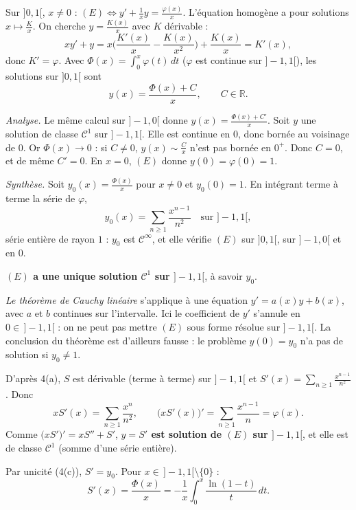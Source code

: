 \documentclass[a4paper,11pt]{article}
\numberwithin{equation}{section}
\numberwithin{figure}{section}
\numberwithin{table}{section}
\theoremstyle{enonce}
\theoremstyle{exemple}
\theoremstyle{remarque}
\newcommand{\R}{\mathbb{R}}
\newcommand{\Q}[1]{\par\needspace{3\baselineskip}\medskip\noindent{\sffamily\bfseries\color{Bleu}#1}\enspace}
\begin{document}
\Q{4(b)} Sur $]0,1[$, $x\neq0$ : $(E)\iff y'+\frac1xy=\frac{\varphi(x)}x$. L'équation homogène a pour solutions $x\mapsto\frac Kx$.
On cherche $y=\frac{K(x)}x$ avec $K$ dérivable :
\[xy'+y=x\Big(\frac{K'(x)}x-\frac{K(x)}{x^2}\Big)+\frac{K(x)}x=K'(x),\]
donc $K'=\varphi$. Avec $\Phi(x)=\int_0^x\varphi(t)\,dt$ ($\varphi$ est continue sur $]-1,1[$), les solutions sur $]0,1[$ sont
\[y(x)=\frac{\Phi(x)+C}{x},\qquad C\in\R .\]

\Q{4(c)} \emph{Analyse.} Le même calcul sur $]-1,0[$ donne $y(x)=\frac{\Phi(x)+C'}x$. Soit $y$ une solution de classe $\mathcal C^1$
sur $]-1,1[$. Elle est continue en $0$, donc bornée au voisinage de $0$. Or $\Phi(x)\to0$ : si $C\neq0$, $y(x)\sim\frac Cx$ n'est
pas bornée en $0^+$. Donc $C=0$, et de même $C'=0$. En $x=0$, $(E)$ donne $y(0)=\varphi(0)=1$.

\emph{Synthèse.} Soit $y_0(x)=\frac{\Phi(x)}x$ pour $x\neq0$ et $y_0(0)=1$. En intégrant terme à terme la série de $\varphi$,
\[y_0(x)=\sum_{n\geq1}\frac{x^{n-1}}{n^2}\quad\text{sur }]-1,1[,\]
série entière de rayon $1$ : $y_0$ est $\mathcal C^\infty$, et elle vérifie $(E)$ sur $]0,1[$, sur $]-1,0[$ et en $0$.

\textbf{$(E)$ a une unique solution $\mathcal C^1$ sur $]-1,1[$}, à savoir $y_0$.

\emph{Le théorème de Cauchy linéaire} s'applique à une équation $y'=a(x)y+b(x)$, avec $a$ et $b$ continues sur l'intervalle. Ici le
coefficient de $y'$ s'annule en $0\in\,]-1,1[$ : on ne peut pas mettre $(E)$ sous forme résolue sur $]-1,1[$. La conclusion du
théorème est d'ailleurs fausse : le problème $y(0)=y_0$ n'a pas de solution si $y_0\neq1$.

\Q{4(d)} D'après 4(a), $S$ est dérivable (terme à terme) sur $]-1,1[$ et $S'(x)=\sum_{n\geq1}\frac{x^{n-1}}{n^2}$. Donc
\[xS'(x)=\sum_{n\geq1}\frac{x^n}{n^2},\qquad\big(xS'(x)\big)'=\sum_{n\geq1}\frac{x^{n-1}}n=\varphi(x).\]
Comme $\big(xS'\big)'=xS''+S'$, \textbf{$y=S'$ est solution de $(E)$ sur $]-1,1[$}, et elle est de classe $\mathcal C^1$ (somme d'une
série entière).

\Q{4(e)} Par unicité (4(c)), $S'=y_0$. Pour $x\in\,]-1,1[\setminus\{0\}$ :
\[S'(x)=\frac{\Phi(x)}x=-\frac1x\int_0^x\frac{\ln(1-t)}t\,dt .\]
\end{document}
